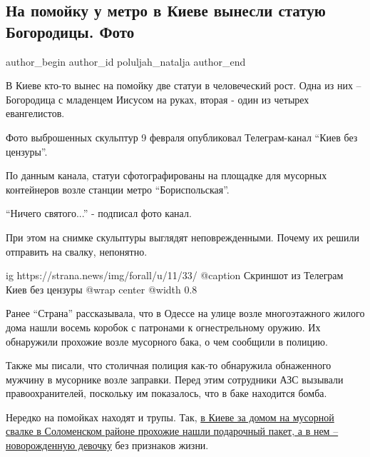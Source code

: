  
 
 
 
 
 
\subsection{На помойку у метро в Киеве вынесли статую Богородицы. Фото}
\label{sec:10_02_2022.stz.news.ua.strana.1.kiev_metro_bogorodica_svalka}
 
\ifcmt
 author_begin
   author_id poluljah_natalja
 author_end
\fi

В Киеве кто-то вынес на помойку две статуи в человеческий рост. Одна из них –
Богородица с младенцем Иисусом на руках, вторая - один из четырех евангелистов.

Фото выброшенных скульптур 9 февраля опубликовал Телеграм-канал \enquote{Киев
без цензуры}.

По данным канала, статуи сфотографированы на площадке для мусорных контейнеров
возле станции метро \enquote{Бориспольская}.

\enquote{Ничего святого...} - подписал фото канал.

При этом на снимке скульптуры выглядят неповрежденными. Почему их решили
отправить на свалку, непонятно.

\ifcmt
  ig https://strana.news/img/forall/u/11/33/%
  @caption Скриншот из Телеграм Киев без цензуры
  @wrap center
  @width 0.8
\fi

Ранее \enquote{Страна} рассказывала, что в Одессе на улице возле многоэтажного
жилого дома нашли восемь коробок с патронами к огнестрельному оружию. Их
обнаружили прохожие возле мусорного бака, о чем сообщили в полицию.

Также мы писали, что столичная полиция как-то обнаружила обнаженного мужчину в
мусорнике возле заправки. Перед этим сотрудники АЗС вызывали правоохранителей,
поскольку им показалось, что в баке находится бомба. 

Нередко на помойках находят и трупы. Так,
\href{https://strana.news/news/161590-v-solomenskom-rajone-kieva-nashli-novorozhdennuju-devochku-na-musornoj-svalke.html}{%
в Киеве за домом на мусорной свалке в Соломенском районе прохожие нашли
подарочный пакет, а в нем – новорожденную девочку} без признаков жизни.
